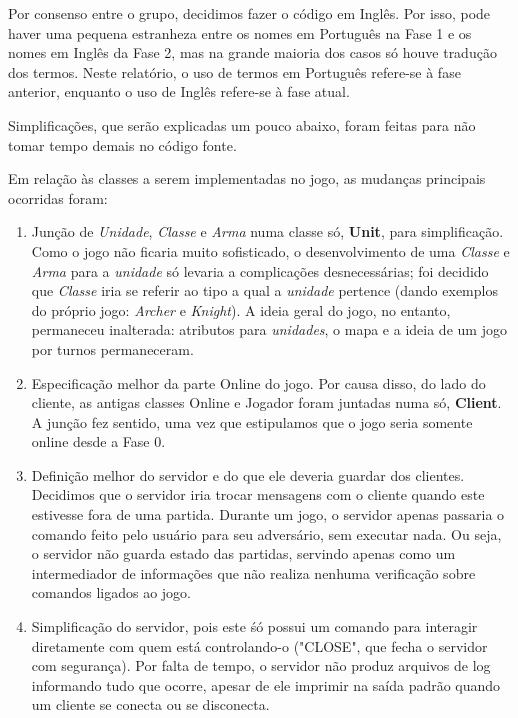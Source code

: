     Por consenso entre o grupo, decidimos fazer o código em Inglês. Por isso, pode haver uma pequena estranheza entre os nomes em Português na Fase 1 e os nomes em Inglês da Fase 2, mas na grande maioria dos casos só houve tradução dos termos. Neste relatório, o uso de termos em Português refere-se à fase anterior, enquanto o uso de Inglês refere-se à fase atual.\par

    Simplificações, que serão explicadas um pouco abaixo, foram feitas para não tomar tempo demais no código fonte. \par

    Em relação às classes a serem implementadas no jogo, as mudanças principais ocorridas foram:
    \begin{enumerate}
        \item Junção de \emph{Unidade}, \emph{Classe} e \emph{Arma} numa classe só, \textbf{Unit}, para simplificação. Como o jogo não ficaria muito sofisticado, o desenvolvimento de uma \emph{Classe} e \emph{Arma} para a \emph{unidade} só levaria a complicações desnecessárias; foi decidido que \emph{Classe} iria se referir ao tipo a qual a \emph{unidade} pertence (dando exemplos do próprio jogo: \emph{Archer} e \emph{Knight}). A ideia geral do jogo, no entanto, permaneceu inalterada: atributos para \emph{unidades}, o mapa e a ideia de um jogo por turnos permaneceram.
        \item Especificação melhor da parte Online do jogo. Por causa disso, do lado do cliente, as antigas classes Online e Jogador foram juntadas numa só, \textbf{Client}. A junção fez sentido, uma vez que estipulamos que o jogo seria somente online desde a Fase 0.
        \item Definição melhor do servidor e do que ele deveria guardar dos clientes. Decidimos que o servidor iria trocar mensagens com o cliente quando este estivesse fora de uma partida. Durante um jogo, o servidor apenas passaria o comando feito pelo usuário para seu adversário, sem executar nada. Ou seja, o servidor não guarda estado das partidas, servindo apenas como um intermediador de informações que não realiza nenhuma verificação sobre comandos ligados ao jogo.
        \item Simplificação do servidor, pois este śó possui um comando para interagir diretamente com quem está controlando-o ("CLOSE", que fecha o servidor com segurança). Por falta de tempo, o servidor não produz arquivos de log informando tudo que ocorre, apesar de ele imprimir na saída padrão quando um cliente se conecta ou se disconecta.
    \end{enumerate}


